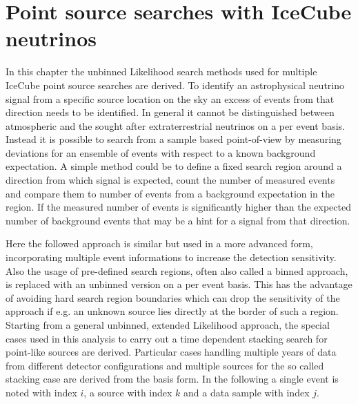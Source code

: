 \chapter{Point source searches with IceCube neutrinos}
In this chapter the unbinned Likelihood search methods used for multiple IceCube point source searches are derived.
To identify an astrophysical neutrino signal from a specific source location on the sky an excess of events from that direction needs to be identified.
In general it cannot be distinguished between atmospheric and the sought after extraterrestrial neutrinos on a per event basis.
Instead it is possible to search from a sample based point-of-view by measuring deviations for an ensemble of events with respect to a known background expectation.
A simple method could be to define a fixed search region around a direction from which signal is expected, count the number of measured events and compare them to number of events from a background expectation in the region.
If the measured number of events is significantly higher than the expected number of background events that may be a hint for a signal from that direction.

Here the followed approach is similar but used in a more advanced form, incorporating multiple event informations to increase the detection sensitivity.
Also the usage of pre-defined search regions, often also called a binned approach, is replaced with an unbinned version on a per event basis.
This has the advantage of avoiding hard search region boundaries which can drop the sensitivity of the approach if e.g. an unknown source lies directly at the border of such a region.
Starting from a general unbinned, extended Likelihood approach, the special cases used in this analysis to carry out a time dependent stacking search for point-like sources are derived.
Particular cases handling multiple years of data from different detector configurations and multiple sources for the so called stacking case are derived from the basis form.
In the following a single event is noted with index $i$, a source with index $k$ and a data sample with index $j$.

